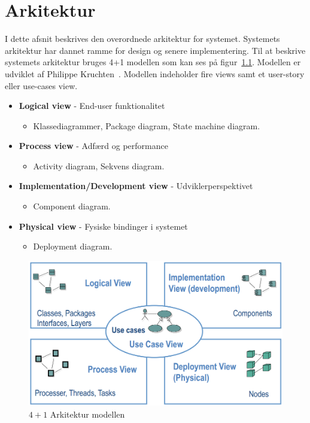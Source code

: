 \chapter{Arkitektur}


I dette afsnit beskrives den overordnede arkitektur for systemet. Systemets arkitektur har dannet ramme for design og senere implementering. Til at beskrive systemets arkitektur bruges 4+1 modellen som kan ses på figur~\ref{fig:41model}. Modellen er udviklet af Philippe Kruchten~\cite{fcgss2007}. Modellen indeholder fire views samt et user-story eller use-cases view.

\begin{itemize}
	\item \textbf{Logical view} - End-user funktionalitet
	\begin{itemize}
		\item Klassediagrammer, Package diagram, State machine diagram.
	\end{itemize}
	\item \textbf{Process view} - Adfærd og performance
	\begin{itemize}
		\item Activity diagram, Sekvens diagram.
	\end{itemize}
	\item \textbf{Implementation/Development view} - Udviklerperspektivet
	\begin{itemize}
		\item Component diagram.
	\end{itemize}
	\item \textbf{Physical view} - Fysiske bindinger i systemet
	\begin{itemize}
		\item Deployment diagram.
	\end{itemize}
\end{itemize}

\begin{figure}[h]
	\centering
	\includegraphics[width=0.9\linewidth]{figs/arkitektur/41model}
	\caption{$4+1$ Arkitektur modellen \cite{flylib}}
	\label{fig:41model}
\end{figure}

